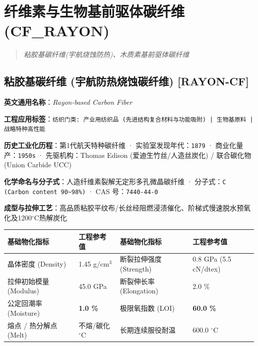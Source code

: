 \documentclass[11pt,openright,twoside,UTF8]{ctexbook}
\begin{document}
\chapter{纤维素与生物基前驱体碳纤维 (CF\_RAYON)}
\begin{quote}
\small\itshape
粘胶基碳纤维(宇航烧蚀防热)、木质素基前驱体碳纤维
\end{quote}

\section{粘胶基碳纤维 (宇航防热烧蚀碳纤维) [RAYON-CF]}
\label{sec:rayon-cf}

\noindent\textbf{英文通用名称}：\textit{Rayon-based Carbon Fiber}\par
\noindent\textbf{工程应用标签}：\texttt{纺织门类: 产业用纺织品 (先进结构复合材料与功能吸附) | 生物基原料 | 战略特种高性能}\par
\noindent\textbf{历史工业化历程}：第1代航天特种碳纤维 · 实验室发现年代：\texttt{1879} · 商业化量产：\texttt{1950s} · 先驱机构：Thomas Edison (爱迪生竹丝/人造丝炭化) / 联合碳化物 (Union Carbide UCC)\par
\noindent\textbf{化学命名与分子式}：人造纤维素裂解无定形多孔微晶碳纤维 · 分子式：\texttt{C (Carbon content 90\textasciitilde{}98\%)} · CAS 号：\texttt{7440-44-0}\par
\noindent\textbf{成型与拉伸工艺}：高品质粘胶平纹布/长丝经阻燃浸渍催化、阶梯式慢速脱水预氧化及1200$^\circ\mathrm{C}$热解炭化\par

\vspace{0.15cm}
\begin{center}
\small
\begin{tabularx}{\textwidth}{p{3.8cm}Xp{3.8cm}X}
\toprule
\textbf{基础物化指标} & \textbf{工程参考值} & \textbf{基础物化指标} & \textbf{工程参考值} \\
\midrule
晶体密度 (Density) & 1.45 g/cm$^3$ & 断裂拉伸强度 (Strength) & 0.8 GPa (5.5 cN/dtex) \\
拉伸初始模量 (Modulus) & 45.0 GPa & 断裂伸长率 (Elongation) & 2.0 \% \\
公定回潮率 (Moisture) & \textbf{1.0 \%} & 极限氧指数 (LOI) & \textbf{60.0 \%} \\
熔点 / 热分解点 (Melt) & 不熔/碳化 $^\circ\mathrm{C}$ & 长期连续服役耐温 & 600.0 $^\circ\mathrm{C}$ \\
\bottomrule
\end{tabularx}
\end{center}
\vspace{0.15cm}
\end{document}
